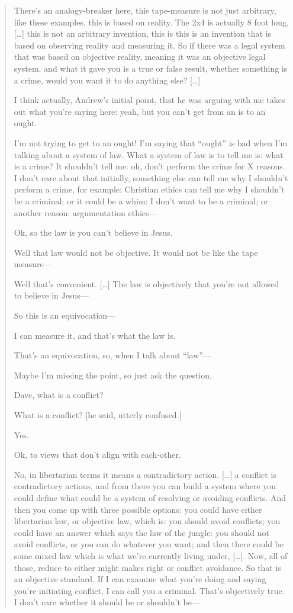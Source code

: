\documentclass[11pt]{article}
\begin{document}
\begin{quote}
There's an analogy-breaker here, this tape-measure is not just arbitrary, like these examples, this is based on reality. The 2x4 is actually 8 foot long, [\ldots{}] this is not an arbitrary invention, this is this is an invention that is based on observing reality and measuring it. So if there was a legal system that was based on objective reality, meaning it was an objective legal system, and what it gave you is a true or false result, whether something is a crime, would you want it to do anything else? [\ldots{}]

I think actually, Andrew's initial point, that he was arguing with me takes out what you're saying here: yeah, but you can't get from an is to an ought.

I'm not trying to get to an ought! I'm saying that ``ought'' is bad when I'm talking about a system of law. What a system of law is to tell me is: what is a crime? It shouldn't tell me: oh, don't perform the crime for X reasons. I don't care about that initially, something else can tell me why I shouldn't perform a crime, for example: Christian ethics can tell me why I shouldn't be a criminal; or it could be a whim: I don't want to be a criminal; or another reason: argumentation ethics---

Ok, so the law is you can't believe in Jesus.

Well that law would not be objective. It would not be like the tape measure---

Well that's convenient. [\ldots{}] The law is objectively that you're not allowed to believe in Jesus---

So this is an equivocation---

I can measure it, and that's what the law is.

That's an equivocation, so, when I talk about ``law''---

Maybe I'm missing the point, so just ask the question.

Dave, what is a conflict?

What is a conflict? [he said, utterly confused.]

Yes.

Ok, to views that don't align with each-other.

No, in libertarian terms it means a contradictory action. [\ldots{}] a conflict is contradictory actions, and from there you can build a system where you could define what could be a system of resolving or avoiding conflicts. And then you come up with three possible options: you could have either libertarian law, or objective law, which is: you should avoid conflicts; you could have an answer which says the law of the jungle: you should not avoid conflicts, or you can do whatever you want; and then there could be some mixed law which is what we're currently living under, [\ldots{}]. Now, all of those, reduce to either might makes right or conflict avoidance. So that is an objective standard. If I can examine what you're doing and saying you're initiating conflict, I can call you a criminal. That's objectively true. I don't care whether it should be or shouldn't be---


\end{quote}
\end{document}
